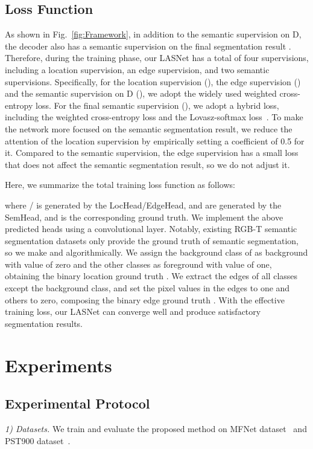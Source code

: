 \documentclass[journal]{IEEEtran}
\begin{document}
\subsection{Loss Function}
\label{sec:Loss Function}
As shown in Fig.~\ref{fig:Framework}, in addition to the semantic supervision on D, the decoder also has a semantic supervision on the final segmentation result .
Therefore, during the training phase, our LASNet has a total of four supervisions, including a location supervision, an edge supervision, and two semantic supervisions.
Specifically, for the location supervision (), the edge supervision () and the semantic supervision on D (), we adopt the widely used weighted cross-entropy loss.
For the final semantic supervision (), we adopt a hybrid loss, including the weighted cross-entropy loss and the Lovasz-softmax loss~\cite{Lovaszloss}.
To make the network more focused on the semantic segmentation result, we reduce the attention of the location supervision by empirically setting a coefficient of 0.5 for it.
Compared to the semantic supervision, the edge supervision has a small loss that does not affect the semantic segmentation result, so we do not adjust it.

Here, we summarize the total training loss function  as follows:

where / is generated by the LocHead/EdgeHead,  and  are generated by the SemHead, and  is the corresponding ground truth.
We implement the above predicted heads using a convolutional layer.
Notably, existing RGB-T semantic segmentation datasets only provide the ground truth of semantic segmentation, so we make  and  algorithmically.
We assign the background class of  as background with value of zero and the other classes as foreground with value of one, obtaining the binary location ground truth .
We extract the edges of all classes except the background class, and set the pixel values in the edges to one and others to zero, composing the binary edge ground truth .
With the effective training loss, our LASNet can converge well and produce satisfactory segmentation results.



\section{Experiments}
\label{sec:exp}

\subsection{Experimental Protocol}
\label{sec:ExpProtocol}
\textit{1) Datasets.}
We train and evaluate the proposed method on MFNet dataset~\cite{2017MFNet} and PST900 dataset~\cite{2020PSTNet}.
\end{document}
